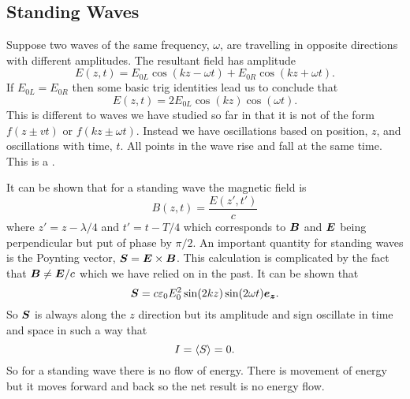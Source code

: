     \subsection{Standing Waves}
    Suppose two waves of the same frequency, \(\omega\), are travelling in opposite directions with different amplitudes.
    The resultant field has amplitude
    \[E(z, t) = E_{0L}\cos(kz - \omega t) + E_{0R}\cos(kz + \omega t).\]
    If \(E_{0L} = E_{0R}\) then some basic trig identities lead us to conclude that
    \[E(z, t) = 2E_{0L}\cos(kz)\cos(\omega t).\]
    This is different to waves we have studied so far in that it is not of the form \(f(z \pm vt)\) or \(f(kz \pm \omega t)\).
    Instead we have oscillations based on position, \(z\), and oscillations with time, \(t\).
    All points in the wave rise and fall at the same time.
    This is a .
    
    It can be shown that for a standing wave the magnetic field is
    \[B(z, t) = \frac{E(z', t')}{c}\]
    where \(z' = z - \lambda/4\) and \(t' = t - T/4\) which corresponds to \(\bm{B}\) and \(\bm{E}\) being perpendicular but put of phase by \(\pi/2\).
    An important quantity for standing waves is the Poynting vector, \(\bm{S} = \bm{E}\times\bm{B}\).
    This calculation is complicated by the fact that \(\bm{B} \ne \bm{E}/c\) which we have relied on in the past.
    It can be shown that
    \[\bm{S} = c\varepsilon_0E_0^2 \sin(2kz)\sin(2\omega t)\bm{e_{z}}.\]
    So \(\bm{S}\) is always along the \(z\) direction but its amplitude and sign oscillate in time and space in such a way that
    \[I = \langle{S}\rangle = 0.\]
    So for a standing wave there is no flow of energy.
    There is movement of energy but it moves forward and back so the net result is no energy flow.
    
